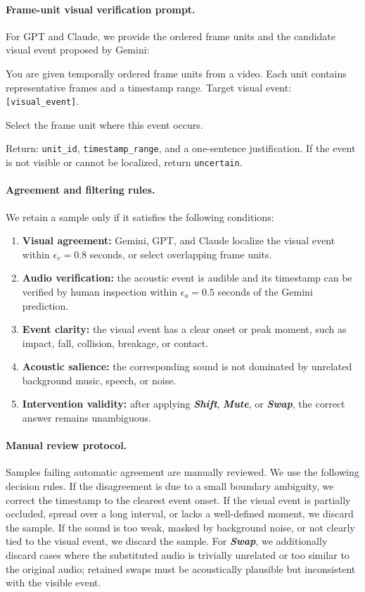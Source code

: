 \documentclass{llmxive}
\providecommand{\shift}{\textbf{\textit{Shift}}\xspace}
\providecommand{\mute}{\textbf{\textit{Mute}}\xspace}
\providecommand{\swap}{\textbf{\textit{Swap}}\xspace}
\begin{document}
\paragraph{Frame-unit visual verification prompt.}
For GPT and Claude, we provide the ordered frame units and the candidate visual event proposed by Gemini:
\begin{tcolorbox}[colback=gray!3,colframe=gray!35,boxrule=0.5pt,arc=2pt]
\small
You are given temporally ordered frame units from a video. Each unit contains representative frames and a timestamp range.  
Target visual event: \texttt{[visual\_event]}.

Select the frame unit where this event occurs. 

Return:
\texttt{unit\_id}, \texttt{timestamp\_range}, and a one-sentence justification.  
If the event is not visible or cannot be localized, return \texttt{uncertain}.
\end{tcolorbox}

\paragraph{Agreement and filtering rules.}
We retain a sample only if it satisfies the following conditions:
\begin{enumerate}[leftmargin=1.5em,itemsep=2pt,topsep=2pt]
    \item \textbf{Visual agreement:} Gemini, GPT, and Claude localize the visual event within $\epsilon_v = 0.8$ seconds, or select overlapping frame units.
    \item \textbf{Audio verification:} the acoustic event is audible and its timestamp can be verified by human inspection within $\epsilon_a = 0.5$ seconds of the Gemini prediction.
    \item \textbf{Event clarity:} the visual event has a clear onset or peak moment, such as impact, fall, collision, breakage, or contact.
    \item \textbf{Acoustic salience:} the corresponding sound is not dominated by unrelated background music, speech, or noise.
    \item \textbf{Intervention validity:} after applying \shift, \mute, or \swap, the correct answer remains unambiguous.
\end{enumerate}

\paragraph{Manual review protocol.}
Samples failing automatic agreement are manually reviewed. We use the following decision rules. If the disagreement is due to a small boundary ambiguity, we correct the timestamp to the clearest event onset. If the visual event is partially occluded, spread over a long interval, or lacks a well-defined moment, we discard the sample. If the sound is too weak, masked by background noise, or not clearly tied to the visual event, we discard the sample. For \swap, we additionally discard cases where the substituted audio is trivially unrelated or too similar to the original audio; retained swaps must be acoustically plausible but inconsistent with the visible event.
\end{document}
